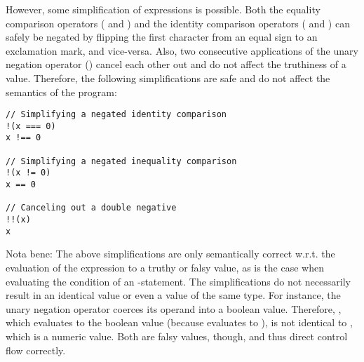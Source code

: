 However, some simplification of expressions is possible. Both the equality comparison operators (\code{==} and \code{!=}) and the identity comparison operators (\code{===} and \code{!==}) can safely be negated by flipping the first character from an equal sign to an exclamation mark, and vice-versa. Also, two consecutive applications of the unary negation operator (\code{!}) cancel each other out and do not affect the truthiness of a value. Therefore, the following simplifications are safe and do not affect the semantics of the program:

\begin{verbatim}
// Simplifying a negated identity comparison
!(x === 0)
x !== 0

// Simplifying a negated inequality comparison
!(x != 0)
x == 0

// Canceling out a double negative
!!(x)
x
\end{verbatim}

Nota bene: The above simplifications are only semantically correct w.r.t. the evaluation of the expression to a truthy or falsy value, as is the case when evaluating the condition of an -statement. The simplifications do not necessarily result in an identical value or even a value of the same type. For instance, the unary negation operator coerces its operand into a boolean value. Therefore, , which evaluates to the boolean value  (because  evaluates to ), is not identical to , which is a numeric value. Both are falsy values, though, and thus direct control flow correctly.
